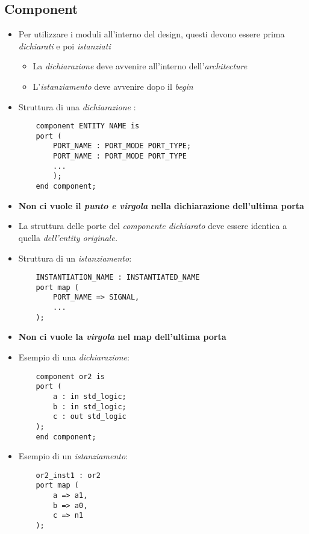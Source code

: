 \documentclass{article}
\begin{document}
\subsection{Component}
\begin{itemize}
	\item Per utilizzare i moduli all'interno del design, questi devono essere prima \textit{dichiarati} e poi \textit{istanziati}
	\begin{itemize}
	\item La \textit{dichiarazione} deve avvenire all'interno dell'\textit{architecture}
	\item L'\textit{istanziamento} deve avvenire dopo il \textit{begin}
\end{itemize}
\item Struttura di una \textit{dichiarazione} :
\begin{verbatim}
    component ENTITY NAME is
    port (
        PORT_NAME : PORT_MODE PORT_TYPE;
        PORT_NAME : PORT_MODE PORT_TYPE
        ...
        );
    end component;
\end{verbatim}
	\item \textbf{Non ci vuole il \textit{punto e virgola} nella dichiarazione dell'ultima porta}
	\item La struttura delle porte del \textit{componente dichiarato} deve essere identica a quella \textit{dell'entity originale.}
\item Struttura di un \textit{istanziamento}:
\begin{verbatim}
    INSTANTIATION_NAME : INSTANTIATED_NAME
    port map (
        PORT_NAME => SIGNAL,
        ...
    );
\end{verbatim}
\item \textbf{Non ci vuole la \textit{virgola} nel map dell'ultima porta}
\item Esempio di una \textit{dichiarazione}:
\begin{verbatim}
    component or2 is
    port (
        a : in std_logic;
        b : in std_logic;
        c : out std_logic
    );
    end component;
\end{verbatim}
\item Esempio di un \textit{istanziamento}:
\begin{verbatim}
    or2_inst1 : or2
    port map (
        a => a1,
        b => a0,
        c => n1
    );
\end{verbatim}
\end{itemize}
\end{document}

